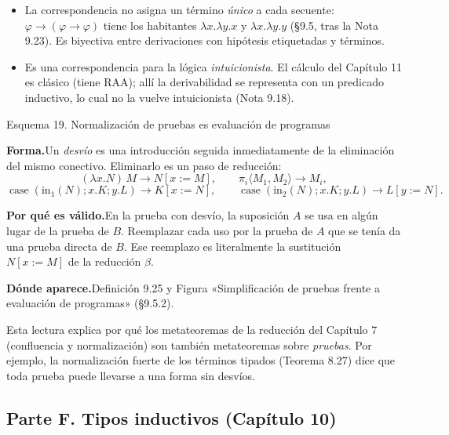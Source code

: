 \documentclass[11pt,a4paper]{article}
\newcommand{\forma}{\par\noindent\textbf{Forma.}\enspace}
\newcommand{\porque}{\par\smallskip\noindent\textbf{Por qué es válido.}\enspace}
\newcommand{\donde}{\par\smallskip\noindent\textbf{Dónde aparece.}\enspace}
\begin{document}
\begin{trampa}
\begin{itemize}
  \item La correspondencia no asigna un término \emph{único} a cada
    secuente: \(\varphi\to(\varphi\to\varphi)\) tiene los habitantes
    \(\lambda x.\lambda y.x\) y \(\lambda x.\lambda y.y\) (§9.5, tras la
    Nota 9.23). Es
    biyectiva entre derivaciones con hipótesis etiquetadas y términos.
  \item Es una correspondencia para la lógica \emph{intuicionista}. El cálculo
    del Capítulo 11 es clásico (tiene RAA); allí la derivabilidad se
    representa con un predicado inductivo, lo cual no la vuelve intuicionista
    (Nota 9.18).
\end{itemize}
\end{trampa}

\begin{esquema}{Esquema 19. Normalización de pruebas es evaluación de programas}
\forma Un \emph{desvío} es una introducción seguida inmediatamente de la
eliminación del mismo conectivo. Eliminarlo es un paso de reducción:
\[
(\lambda x.N)\,M\to N[x:=M],\qquad
\pi_i\langle M_1,M_2\rangle\to M_i,
\]
\[
\operatorname{case}(\mathrm{in}_1(N);x.K;y.L)\to K[x:=N],\qquad
\operatorname{case}(\mathrm{in}_2(N);x.K;y.L)\to L[y:=N].
\]

\porque En la prueba con desvío, la suposición \(A\) se usa en algún lugar de
la prueba de \(B\). Reemplazar cada uso por la prueba de \(A\) que se tenía da
una prueba directa de \(B\). Ese reemplazo es literalmente la sustitución
\(N[x:=M]\) de la reducción \(\beta\).

\donde Definición 9.25 y Figura «Simplificación de pruebas frente a evaluación
de programas» (§9.5.2).
\end{esquema}

\begin{nota}
Esta lectura explica por qué los metateoremas de la reducción del
Capítulo 7 (confluencia y normalización) son también metateoremas sobre
\emph{pruebas}. Por ejemplo, la normalización fuerte de los términos tipados
(Teorema 8.27) dice que toda prueba puede llevarse a una forma sin desvíos.
\end{nota}

\subsection*{Parte F. Tipos inductivos (Capítulo 10)}
\end{document}
